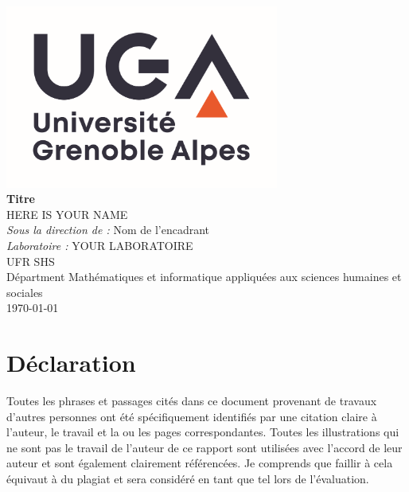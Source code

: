 \documentclass[12pt,oneside,french]{book}
\begin{document}

\frontmatter

\begin{titlepage}
	
	

\begin{center}
\includegraphics[width=9cm]{images/logo.png}\\[1cm]
\linespread{1.2}\huge {\bfseries Titre}\\[1.5cm]
\linespread{1}
{\Large HERE IS YOUR NAME}\\[1cm]
{\large \emph{Sous la direction de :} Nom de l'encadrant}\\[1cm] %
{\large  \emph{Laboratoire :} YOUR LABORATOIRE}\\[1cm]  
{\large
UFR SHS\\
Départment Mathématiques et informatique appliquées aux sciences humaines et sociales\\
\today}
\end{center}
\end{titlepage}



\newpage
\section*{\Large Déclaration}

Toutes les phrases et passages cités dans ce document provenant de travaux d'autres personnes ont été spécifiquement identifiés par une citation claire à l'auteur, le travail et la ou les pages correspondantes.
Toutes les illustrations qui ne sont pas le travail de l'auteur de ce rapport sont utilisées avec l'accord de leur auteur et sont également clairement référencées. Je comprends que faillir à cela équivaut à du plagiat et sera considéré en tant que tel lors de l'évaluation.\\[1cm]
\end{document}
